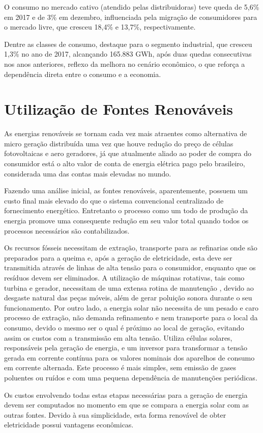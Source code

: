 O consumo no mercado cativo (atendido pelas distribuidoras) teve queda de 5,6\% em 2017 e de 3\% em dezembro, influenciada pela migração de consumidores para o mercado livre, que cresceu 18,4\% e 13,7\%, respectivamente.

Dentre as classes de consumo, destaque para o segmento industrial, que cresceu 1,3\% no ano de 2017, alcançando 165.883 GWh, após duas quedas consecutivas nos anos anteriores, reflexo da melhora no cenário econômico, o que reforça a dependência direta entre o consumo e a economia.

\section{Utilização de Fontes Renováveis}

As energias renováveis se tornam cada vez mais atraentes como alternativa de micro geração distribuída uma vez que houve redução do preço de células fotovoltaicas e aero geradores, já que atualmente aliado ao poder de compra do consumidor está o alto valor de conta de energia elétrica pago pelo brasileiro, considerada uma das contas mais elevadas no mundo. \cite{barbosa2013geraccao}

Fazendo uma análise inicial, as fontes renováveis, aparentemente, possuem um custo final mais elevado do que o sistema convencional centralizado de fornecimento energético. Entretanto o processo como um todo de produção da energia promove uma consequente redução
em seu valor total quando todos os processos necessários são contabilizados.

Os recursos fósseis necessitam de extração, transporte para as refinarias onde são preparados para a queima e, após a geração de eletricidade, esta deve ser transmitida através de linhas de alta tensão para o consumidor, enquanto que os resíduos devem ser eliminados. A utilização de máquinas rotativas, tais como turbina e gerador, necessitam de uma extensa rotina de manutenção , devido ao desgaste natural das peças móveis, além de gerar poluição sonora durante o seu funcionamento. Por outro lado, a energia solar não necessita de um pesado e caro processo de extração, não demanda refinamento e nem transporte para o local da consumo, devido o mesmo ser o qual é próximo ao local de geração, evitando assim os custos com a transmissão em alta tensão. Utiliza células solares, responsáveis pela geração de energia, e um inversor para transformar a tensão gerada em corrente contínua para os valores nominais dos aparelhos de consumo em corrente alternada. Este processo é mais simples, sem emissão de gases poluentes ou ruídos e com uma pequena dependência de manutenções periódicas.\cite{galdino2000contexto}

Os custos envolvendo todas estas etapas necessárias para a geração de
energia devem ser computados no momento em que se compara a energia solar
com as outras fontes. Devido à sua simplicidade, esta forma renovável de obter
eletricidade possui vantagens econômicas. 